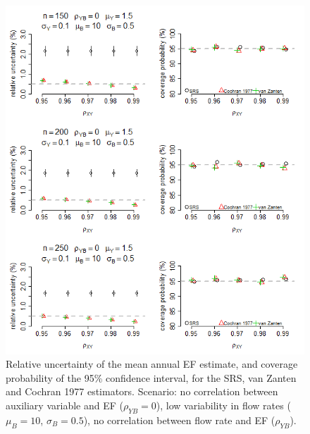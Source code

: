 \begin{figure}[h]
	\centering
	\includegraphics[width=\textwidth]{graphs/Results_Combined_withoutBoot_LowFlowRateVar250.png}
	\caption{Relative uncertainty of the mean annual EF estimate, and coverage probability of the 95\% confidence interval, for the SRS, van Zanten and Cochran 1977 estimators. Scenario: no correlation between auxiliary variable and EF ($\rho_{YB}=0$), low variability in flow rates ($\mu_B=10$, $\sigma_B=0.5$), no correlation between flow rate and EF ($\rho_{YB}$).}
	\label{fig:Batch4}
\end{figure}

